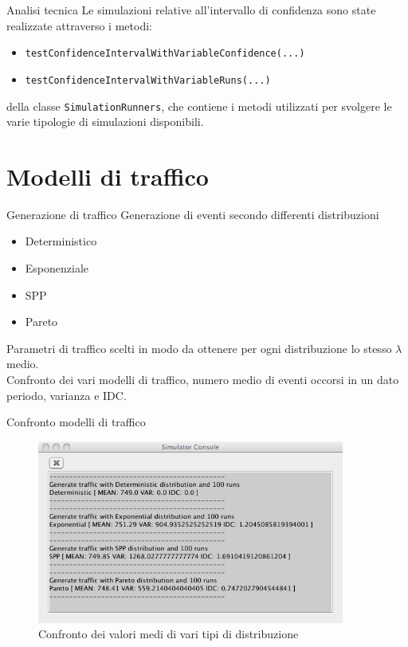 \documentclass[slidestop,compress,mathserif]{beamer}
\begin{document}
\begin{frame}{Analisi tecnica}
\vfill
Le simulazioni relative all'intervallo di confidenza sono state realizzate attraverso i metodi:
\begin{itemize}
\footnotesize
\item {\tt testConfidenceIntervalWithVariableConfidence(...)} 
\item {\tt testConfidenceIntervalWithVariableRuns(...)}
\end{itemize} 
\normalsize
della classe {\tt SimulationRunners}, che contiene i metodi utilizzati per svolgere le varie tipologie di simulazioni disponibili.
\vfill
\end{frame}

\section{Modelli di traffico}
\begin{frame}{Generazione di traffico}
\vfill
Generazione di eventi secondo differenti distribuzioni
\begin{itemize}
		\item Deterministico
		\item Esponenziale
		\item SPP
		\item Pareto
\end{itemize}
Parametri di traffico scelti in modo da ottenere per ogni distribuzione lo stesso $\lambda$ medio.\\
Confronto dei vari modelli di traffico, numero medio di eventi occorsi in un dato periodo, varianza e IDC.
\vfill
\end{frame}


\begin{frame}{Confronto modelli di traffico}
\begin{figure}[!h]{
	\begin{center}
	   \includegraphics[width=0.9\textwidth]{figures/simconsole.png}
	\end{center}}
	\caption{Confronto dei valori medi di vari tipi di distribuzione}
	\label{fig:random}
\end{figure}
\end{frame}
\end{document}
